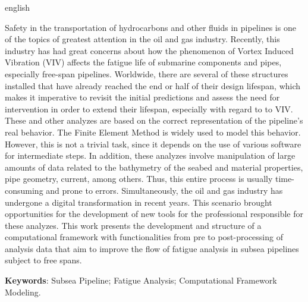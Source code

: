 \begin{resumo}[Abstract]
    \begin{otherlanguage*}{english}

    Safety in the transportation of hydrocarbons and other fluids in pipelines is one of the topics of greatest attention in the oil and gas industry.
    Recently, this industry has had great concerns about how the phenomenon of Vortex Induced Vibration (VIV) affects the fatigue life of submarine components and pipes, especially free-span pipelines.
    Worldwide, there are several of these structures installed that have already reached the end or half of their design lifespan, which makes it imperative to revisit the initial predictions and assess the need for intervention in order to extend their lifespan, especially with regard to to VIV.
    These and other analyzes are based on the correct representation of the pipeline's real behavior.
    The Finite Element Method is widely used to model this behavior.
    However, this is not a trivial task, since it depends on the use of various software for intermediate steps.
    In addition, these analyzes involve manipulation of large amounts of data related to the bathymetry of the seabed and material properties, pipe geometry, current, among others.
    Thus, this entire process is usually time-consuming and prone to errors.
    Simultaneously, the oil and gas industry has undergone a digital transformation in recent years.
    This scenario brought opportunities for the development of new tools for the professional responsible for these analyzes.
    This work presents the development and structure of a computational framework with functionalities from pre to post-processing of analysis data that aim to improve the flow of fatigue analysis in subsea pipelines subject to free spans.

    \vspace{\onelineskip}

    \noindent
    \textbf{Keywords}: Subsea Pipeline; Fatigue Analysis; Computational Framework Modeling.
    \end{otherlanguage*}
\end{resumo}